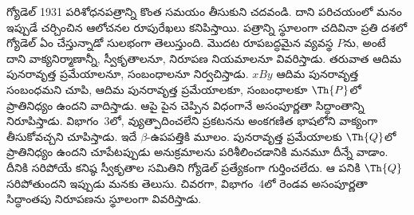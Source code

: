 \documentclass[../../../include/open-logic-section]{subfiles}
\begin{document}


గ్యోడెల్ 1931 పరిశోధనపత్రాన్ని కొంత సమయం తీసుకుని చదవండి. దాని పరిచయంలో మనం
ఇప్పుడే చర్చించిన ఆలోచనల రూపురేఖలు కనిపిస్తాయి. పత్రాన్ని స్థూలంగా చదివినా
ప్రతి దశలో గ్యోడెల్ ఏం చేస్తున్నాడో సులభంగా తెలుస్తుంది. మొదట రూపబద్ధమైన
వ్యవస్థ $P$ను, అంటే దాని వాక్యనిర్మాణాన్నీ, స్వీకృతాలనూ, నిరూపణ నియమాలనూ
వివరిస్తాడు. తరువాత ఆదిమ పునరావృత్త ప్రమేయాలనూ, సంబంధాలనూ నిర్వచిస్తాడు.
$x B y$ ఆదిమ పునరావృత్త సంబంధమని చూపి, ఆదిమ పునరావృత్త ప్రమేయాలకూ,
సంబంధాలకూ $\Th{P}$లో ప్రాతినిధ్యం ఉందని వాదిస్తాడు. ఆపై పైన చెప్పిన
విధంగానే అసంపూర్ణతా సిద్ధాంతాన్ని నిరూపిస్తాడు. విభాగం~3లో,
వ్యుత్పాదించలేని ప్రకటనను అంకగణిత భాషలోని వాక్యంగా తీసుకోవచ్చని చూపిస్తాడు.
ఇదే $\beta$-ఉపపత్తికి మూలం. పునరావృత్త ప్రమేయాలకు $\Th{Q}$లో
ప్రాతినిధ్యం ఉందని చూపేటప్పుడు అనుక్రమాలను పరిశీలించడానికి మనమూ దీన్నే వాడాం.
దీనికి సరిపోయే కనిష్ఠ స్వీకృతాల సమితిని గ్యోడెల్ ప్రత్యేకంగా గుర్తించలేదు.
ఆ పనికి $\Th{Q}$ సరిపోతుందని ఇప్పుడు మనకు తెలుసు. చివరగా,
విభాగం~4లో రెండవ అసంపూర్ణతా సిద్ధాంతపు నిరూపణను స్థూలంగా వివరిస్తాడు.
\end{document}
